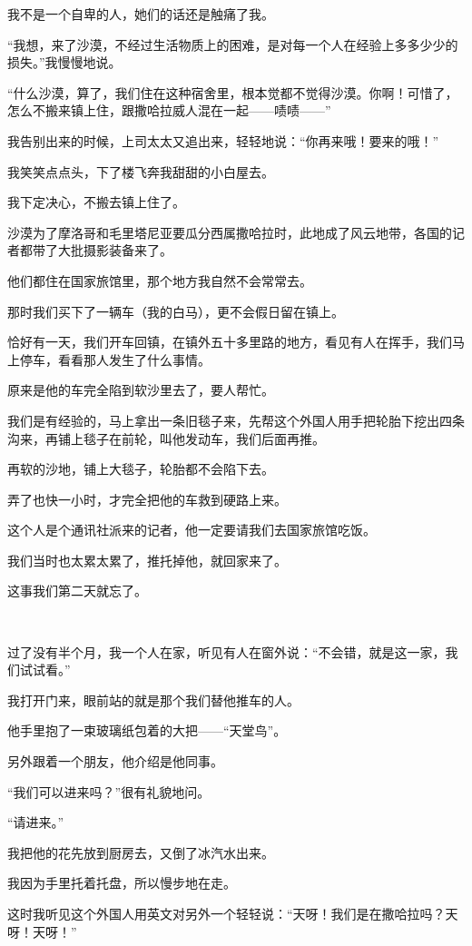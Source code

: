 \par 我不是一个自卑的人，她们的话还是触痛了我。
\par “我想，来了沙漠，不经过生活物质上的困难，是对每一个人在经验上多多少少的损失。”我慢慢地说。
\par “什么沙漠，算了，我们住在这种宿舍里，根本觉都不觉得沙漠。你啊！可惜了，怎么不搬来镇上住，跟撒哈拉威人混在一起——啧啧——”
\par 我告别出来的时候，上司太太又追出来，轻轻地说：“你再来哦！要来的哦！”
\par 我笑笑点点头，下了楼飞奔我甜甜的小白屋去。
\par 我下定决心，不搬去镇上住了。
\par 沙漠为了摩洛哥和毛里塔尼亚要瓜分西属撒哈拉时，此地成了风云地带，各国的记者都带了大批摄影装备来了。
\par 他们都住在国家旅馆里，那个地方我自然不会常常去。
\par 那时我们买下了一辆车（我的白马），更不会假日留在镇上。
\par 恰好有一天，我们开车回镇，在镇外五十多里路的地方，看见有人在挥手，我们马上停车，看看那人发生了什么事情。
\par 原来是他的车完全陷到软沙里去了，要人帮忙。
\par 我们是有经验的，马上拿出一条旧毯子来，先帮这个外国人用手把轮胎下挖出四条沟来，再铺上毯子在前轮，叫他发动车，我们后面再推。
\par 再软的沙地，铺上大毯子，轮胎都不会陷下去。
\par 弄了也快一小时，才完全把他的车救到硬路上来。
\par 这个人是个通讯社派来的记者，他一定要请我们去国家旅馆吃饭。
\par 我们当时也太累太累了，推托掉他，就回家来了。
\par 这事我们第二天就忘了。
\par  
\par 过了没有半个月，我一个人在家，听见有人在窗外说：“不会错，就是这一家，我们试试看。”
\par 我打开门来，眼前站的就是那个我们替他推车的人。
\par 他手里抱了一束玻璃纸包着的大把——“天堂鸟”。
\par 另外跟着一个朋友，他介绍是他同事。
\par “我们可以进来吗？”很有礼貌地问。
\par “请进来。”
\par 我把他的花先放到厨房去，又倒了冰汽水出来。
\par 我因为手里托着托盘，所以慢步地在走。
\par 这时我听见这个外国人用英文对另外一个轻轻说：“天呀！我们是在撒哈拉吗？天呀！天呀！”
